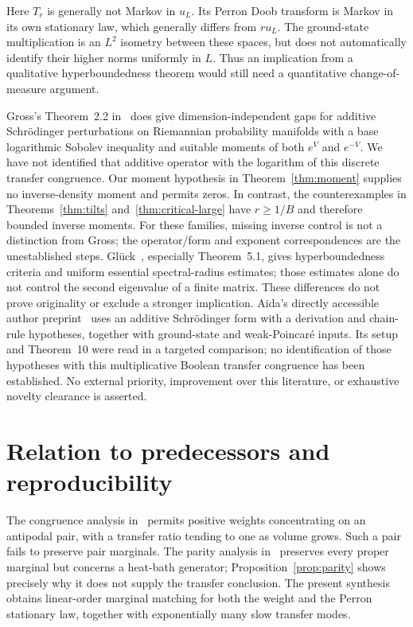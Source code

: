\documentclass[11pt]{article}
\begin{document}
Here $T_r$ is generally not Markov in $u_L$. Its Perron Doob transform
is Markov in its own stationary law, which generally differs from $r u_L$.
The ground-state multiplication is an $L^2$ isometry between these spaces,
but does not automatically identify their higher norms uniformly in $L$.
Thus an implication from a qualitative hyperboundedness theorem would
still need a quantitative change-of-measure argument.

Gross's Theorem~2.2 in~\cite{Gross} does give dimension-independent gaps
for additive Schr\"odinger perturbations on Riemannian probability
manifolds with a base logarithmic Sobolev inequality and suitable moments
of both $e^V$ and $e^{-V}$. We have not identified that additive operator
with the logarithm of this discrete transfer congruence. Our moment
hypothesis in Theorem~\ref{thm:moment} supplies no inverse-density moment
and permits zeros. In contrast, the counterexamples in
Theorems~\ref{thm:tilts} and~\ref{thm:critical-large} have $r\ge1/B$ and therefore bounded inverse
moments. For these families, missing inverse control is not a distinction
from Gross; the operator/form and exponent correspondences are the
unestablished steps.
Gl\"uck~\cite{Gluck}, especially Theorem~5.1, gives hyperboundedness criteria and uniform essential
spectral-radius estimates; those estimates alone do not control the
second eigenvalue of a finite matrix. These differences do not prove
originality or exclude a stronger implication. Aida's directly accessible author preprint~\cite{Aida}
uses an additive Schr\"odinger form with a derivation and chain-rule
hypotheses, together with ground-state and weak-Poincar\'e inputs.
Its setup and Theorem~10 were read in a targeted comparison; no
identification of those hypotheses with this multiplicative Boolean
transfer congruence has been established. No external priority, improvement over this literature, or exhaustive
novelty clearance is asserted.

\section{Relation to predecessors and reproducibility}
The congruence analysis in~\cite{ErikssonCongruence} permits positive
weights concentrating on an antipodal pair, with a transfer ratio tending
to one as volume grows. Such a pair fails to preserve pair marginals.
The parity analysis in~\cite{ErikssonParity} preserves every proper
marginal but concerns a heat-bath generator; Proposition~\ref{prop:parity}
shows precisely why it does not supply the transfer conclusion.
The present synthesis obtains linear-order marginal matching for both
the weight and the Perron stationary law, together with exponentially
many slow transfer modes.
\end{document}
